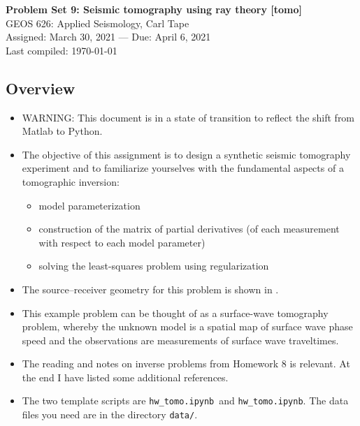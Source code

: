 \documentclass[11pt,titlepage,fleqn]{article}
\newcommand{\tfiletomo}{{\tt hw\_tomo.ipynb}}
\newcommand{\tfileGik}{{\tt hw\_tomo.ipynb}}
\begin{document}

\begin{spacing}{1.2}
\centering
{\large \bf Problem Set 9: Seismic tomography using ray theory [tomo]} \\
GEOS 626: Applied Seismology, Carl Tape \\
Assigned: March 30, 2021 --- Due: April 6, 2021 \\
Last compiled: \today
\end{spacing}


\subsection*{Overview}

\begin{itemize}
\item WARNING: This document is in a state of transition to reflect the shift from Matlab to Python.

\item The objective of this assignment is to design a synthetic seismic tomography experiment and to familiarize yourselves with the fundamental aspects of a tomographic inversion:
%
\begin{itemize}
\item model parameterization
\item construction of the matrix of partial derivatives (of each measurement with respect to each model parameter)
\item solving the least-squares problem using regularization
\end{itemize}

\item The source--receiver geometry for this problem is shown in .

\item This example problem can be thought of as a surface-wave tomography problem, whereby the unknown model is a spatial map of surface wave phase speed and the observations are measurements of surface wave traveltimes.

\item The reading and notes on inverse problems from Homework 8 is relevant.
At the end I have listed some additional references.
\nocite{Tape2007,Menke,AsterE2,Tarantola2005}

\item 
The two template scripts are \tfileGik\ and \tfiletomo.
The data files you need are in the directory \verb+data/+. \\

\end{itemize}
\end{document}
